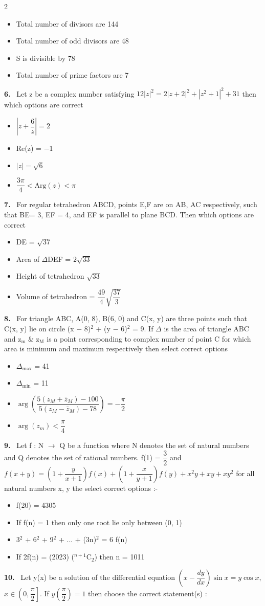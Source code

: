 \documentclass[10pt]{extarticle}
\newcommand{\qn}[1]{\par\smallskip\noindent\textbf{#1.}~}
\newenvironment{qoptions}{\begin{itemize}[leftmargin=1.8em,itemsep=1pt,topsep=2pt,label={}]}{\end{itemize}}
\newcommand{\opt}[2]{\item[(#1)] #2}
\begin{document}
\begin{multicols}{2}
\begin{qoptions}
\opt{A}{Total number of divisors are 144}
\opt{B}{Total number of odd divisors are 48}
\opt{C}{S is divisible by 78}
\opt{D}{Total number of prime factors are 7}
\end{qoptions}
\qn{6} Let z be a complex number satisfying $12|z|^2=2|z+2|^2+|z^2+1|^2+31$ then which options are correct
\begin{qoptions}
\opt{A}{$\left|z+\dfrac6z\right|=2$}
\opt{B}{Re(z) = $-$1}
\opt{C}{$|z|=\sqrt6$}
\opt{D}{$\dfrac{3\pi}4<\mathrm{Arg}(z)<\pi$}
\end{qoptions}
\qn{7} For regular tetrahedron ABCD, points E,F are on AB, AC respectively, such that BE= 3, EF = 4, and EF is parallel to plane BCD. Then which options are correct
\begin{qoptions}
\opt{A}{DE = $\sqrt{37}$}
\opt{B}{Area of $\Delta$DEF = $2\sqrt{33}$}
\opt{C}{Height of tetrahedron $\sqrt{33}$}
\opt{D}{Volume of tetrahedron = $\dfrac{49}4\sqrt{\dfrac{37}3}$}
\end{qoptions}
\qn{8} For triangle ABC, A(0, 8), B(6, 0) and C(x, y) are three points such that C(x, y) lie on circle (x $-$ 8)$^2$ + (y $-$ 6)$^2$ = 9. If $\Delta$ is the area of triangle ABC and z$_\mathrm m$ \& z$_\mathrm M$ is a point corresponding to complex number of point C for which area is minimum and maximum respectively then select correct options
\begin{qoptions}
\opt{A}{$\Delta_{\max}$ = 41}
\opt{B}{$\Delta_{\min}$ = 11}
\opt{C}{$\arg\left(\dfrac{5\left(z_M+\bar z_M\right)-100}{5\left(z_M-\bar z_M\right)-78}\right)=-\dfrac\pi2$}
\opt{D}{$\arg(z_m)<\dfrac\pi4$}
\end{qoptions}
\qn{9} Let f : N $\longrightarrow$ Q be a function where N denotes the set of natural numbers and Q denotes the set of rational numbers. f(1) = $\dfrac32$ and $f(x+y)=\left(1+\dfrac y{x+1}\right)f(x)+\left(1+\dfrac x{y+1}\right)f(y)+x^2y+xy+xy^2$ for all natural numbers x, y the select correct options :-
\begin{qoptions}
\opt{A}{f(20) = 4305}
\opt{B}{If f(n) = 1 then only one root lie only between (0, 1)}
\opt{C}{3$^2$ + 6$^2$ + 9$^2$ + ... + (3n)$^2$ = 6 f(n)}
\opt{D}{If 2f(n) = (2023) ($^{n+1}$C$_2$) then n = 1011}
\end{qoptions}
\qn{10} Let y(x) be a solution of the differential equation $\left(x-\dfrac{dy}{dx}\right)\sin x=y\cos x$, $x\in\left(0,\dfrac\pi2\right]$. If $y\left(\dfrac\pi2\right)=1$ then choose the correct statement(s) :
\begin{qoptions}

\end{qoptions}
\end{multicols}
\end{document}
